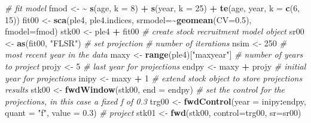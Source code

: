 \documentclass[
]{book}
\newenvironment{Shaded}{\begin{snugshade}}{\end{snugshade}}
\newcommand{\AttributeTok}[1]{\textcolor[rgb]{0.13,0.29,0.53}{#1}}
\newcommand{\CommentTok}[1]{\textcolor[rgb]{0.56,0.35,0.01}{\textit{#1}}}
\newcommand{\DecValTok}[1]{\textcolor[rgb]{0.00,0.00,0.81}{#1}}
\newcommand{\ErrorTok}[1]{\textcolor[rgb]{0.64,0.00,0.00}{\textbf{#1}}}
\newcommand{\FloatTok}[1]{\textcolor[rgb]{0.00,0.00,0.81}{#1}}
\newcommand{\FunctionTok}[1]{\textcolor[rgb]{0.13,0.29,0.53}{\textbf{#1}}}
\newcommand{\NormalTok}[1]{#1}
\newcommand{\OtherTok}[1]{\textcolor[rgb]{0.56,0.35,0.01}{#1}}
\newcommand{\SpecialCharTok}[1]{\textcolor[rgb]{0.81,0.36,0.00}{\textbf{#1}}}
\newcommand{\StringTok}[1]{\textcolor[rgb]{0.31,0.60,0.02}{#1}}
\begin{document}
\begin{Shaded}
\begin{Highlighting}[]
\CommentTok{\# fit model}
\NormalTok{fmod }\OtherTok{\textless{}{-}} \ErrorTok{\textasciitilde{}} \FunctionTok{s}\NormalTok{(age, }\AttributeTok{k =} \DecValTok{8}\NormalTok{) }\SpecialCharTok{+} \FunctionTok{s}\NormalTok{(year, }\AttributeTok{k =} \DecValTok{25}\NormalTok{) }\SpecialCharTok{+} \FunctionTok{te}\NormalTok{(age, year, }\AttributeTok{k =} \FunctionTok{c}\NormalTok{(}\DecValTok{6}\NormalTok{, }\DecValTok{15}\NormalTok{))}
\NormalTok{fit00 }\OtherTok{\textless{}{-}} \FunctionTok{sca}\NormalTok{(ple4, ple4.indices, }\AttributeTok{srmodel=}\SpecialCharTok{\textasciitilde{}}\FunctionTok{geomean}\NormalTok{(}\AttributeTok{CV=}\FloatTok{0.5}\NormalTok{), }\AttributeTok{fmodel=}\NormalTok{fmod)}
\NormalTok{stk00 }\OtherTok{\textless{}{-}}\NormalTok{ ple4 }\SpecialCharTok{+}\NormalTok{ fit00}
\CommentTok{\# create stock recruitment model object}
\NormalTok{sr00 }\OtherTok{\textless{}{-}} \FunctionTok{as}\NormalTok{(fit00, }\StringTok{"FLSR"}\NormalTok{)}
\CommentTok{\# set projection}
\CommentTok{\# number of iterations}
\NormalTok{nsim }\OtherTok{\textless{}{-}} \DecValTok{250}
\CommentTok{\# most recent year in the data}
\NormalTok{maxy }\OtherTok{\textless{}{-}} \FunctionTok{range}\NormalTok{(ple4)[}\StringTok{"maxyear"}\NormalTok{]}
\CommentTok{\# number of years to project}
\NormalTok{projy }\OtherTok{\textless{}{-}} \DecValTok{5}
\CommentTok{\# last year for projections}
\NormalTok{endpy }\OtherTok{\textless{}{-}}\NormalTok{ maxy }\SpecialCharTok{+}\NormalTok{ projy}
\CommentTok{\# initial year for projections}
\NormalTok{inipy }\OtherTok{\textless{}{-}}\NormalTok{ maxy }\SpecialCharTok{+} \DecValTok{1}
\CommentTok{\# extend stock object to store projection\textquotesingle{}s results}
\NormalTok{stk00 }\OtherTok{\textless{}{-}} \FunctionTok{fwdWindow}\NormalTok{(stk00, }\AttributeTok{end =}\NormalTok{ endpy)}
\CommentTok{\# set the control for the projections, in this case a fixed f of 0.3}
\NormalTok{trg00 }\OtherTok{\textless{}{-}} \FunctionTok{fwdControl}\NormalTok{(}\AttributeTok{year =}\NormalTok{ inipy}\SpecialCharTok{:}\NormalTok{endpy, }\AttributeTok{quant =} \StringTok{"f"}\NormalTok{, }\AttributeTok{value =} \FloatTok{0.3}\NormalTok{)}
\CommentTok{\# project}
\NormalTok{stk01 }\OtherTok{\textless{}{-}} \FunctionTok{fwd}\NormalTok{(stk00, }\AttributeTok{control=}\NormalTok{trg00, }\AttributeTok{sr=}\NormalTok{sr00)}
\end{Highlighting}
\end{Shaded}
\end{document}
